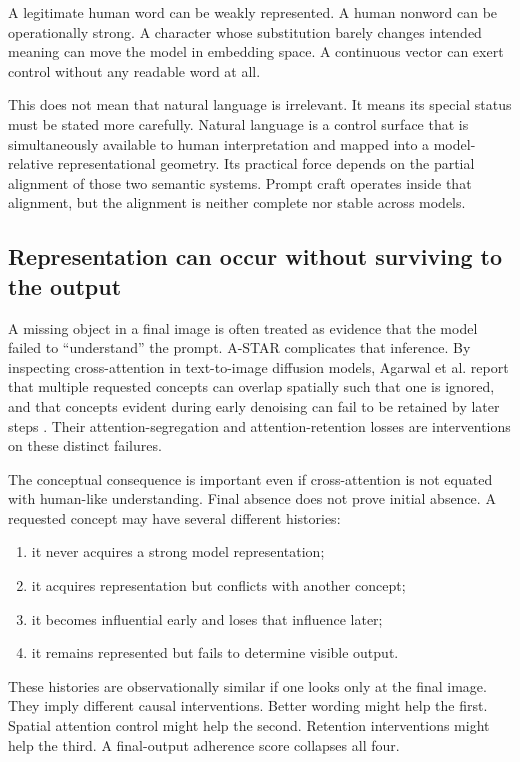 \documentclass[11pt]{article}
\begin{document}
A legitimate human word can be weakly represented. A human nonword can be operationally strong. A character whose substitution barely changes intended meaning can move the model in embedding space. A continuous vector can exert control without any readable word at all.

This does not mean that natural language is irrelevant. It means its special status must be stated more carefully. Natural language is a control surface that is simultaneously available to human interpretation and mapped into a model-relative representational geometry. Its practical force depends on the partial alignment of those two semantic systems. Prompt craft operates inside that alignment, but the alignment is neither complete nor stable across models.

\subsection{Representation can occur without surviving to the output}

A missing object in a final image is often treated as evidence that the model failed to ``understand'' the prompt. A-STAR complicates that inference. By inspecting cross-attention in text-to-image diffusion models, Agarwal et al. report that multiple requested concepts can overlap spatially such that one is ignored, and that concepts evident during early denoising can fail to be retained by later steps \citep{Agarwal2023ASTAR}. Their attention-segregation and attention-retention losses are interventions on these distinct failures.

The conceptual consequence is important even if cross-attention is not equated with human-like understanding. Final absence does not prove initial absence. A requested concept may have several different histories:

\begin{enumerate}[leftmargin=1.5em]
\item it never acquires a strong model representation;
\item it acquires representation but conflicts with another concept;
\item it becomes influential early and loses that influence later;
\item it remains represented but fails to determine visible output.
\end{enumerate}

These histories are observationally similar if one looks only at the final image. They imply different causal interventions. Better wording might help the first. Spatial attention control might help the second. Retention interventions might help the third. A final-output adherence score collapses all four.
\end{document}
